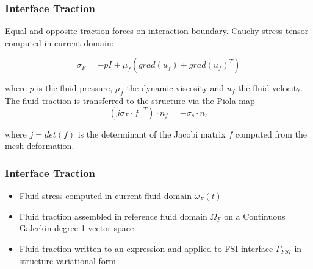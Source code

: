 \documentclass{beamer}
\begin{document}
\begin{frame}
\frametitle{Interface Traction}
Equal and opposite traction forces on interaction boundary. Cauchy stress tensor computed in current domain: 

\begin{equation}
\sigma_F = -p I + \mu_f (grad(u_f) + grad(u_f)^T )
\end{equation}

where $p$ is the fluid pressure, $\mu_f$ the dynamic viscosity and $u_f$ the fluid velocity. The fluid traction is transferred to the structure via the Piola map
\begin{equation}
 (j \sigma_F \cdot f^{-T}) \cdot n_f = -\sigma_s \cdot n_s 
\end{equation}

where $j = det (f)$ is the determinant of the Jacobi matrix $f$ computed from the mesh deformation. 




\end{frame}

\begin{frame}
\frametitle{Interface Traction}

\begin{itemize}
\item Fluid stress computed in current fluid domain $\omega_F(t)$
\item Fluid traction assembled in reference fluid domain $\Omega_F$ on a Continuous Galerkin degree 1 vector space 
\item Fluid traction written to an expression and applied to FSI interface $\Gamma_{FSI}$ in structure variational form 
\end{itemize}


\end{frame}
\end{document}
